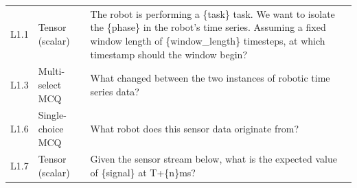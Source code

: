 \documentclass{article}
\begin{document}
\begin{small}
\begin{longtable}{@{}>{\centering\arraybackslash}p{}>{\raggedright\arraybackslash}p{}>{\raggedright\arraybackslash}p{}@{}}
        \multicolumn{3}{@{}l@{}}{\textbf{Level 1: State}}                                                                                                                                                                                                                                                                                                                                                                                                                                                                                         \\
        \midrule
        L1.1        & Tensor (scalar)        & The robot is performing a \{task\} task. We want to isolate the \{phase\} in the robot's time series. Assuming a fixed window length of \{window\_length\} timesteps, at which timestamp should the window begin?                                                                                                                                                                                                                                                                                  \\
        L1.3        & Multi-select MCQ       & What changed between the two instances of robotic time series data?                                                                                                                                                                                                                                                                                                                                                                                                                                \\
        L1.6        & Single-choice MCQ      & What robot does this sensor data originate from?                                                                                                                                                                                                                                                                                                                                                                                                                                                   \\
        L1.7        & Tensor (scalar)        & Given the sensor stream below, what is the expected value of \{signal\} at T+\{n\}ms?                                                                                                                                                                                                                                                                                                                                                                                                              \\
        \midrule


\end{longtable}
\end{small}
\end{document}
